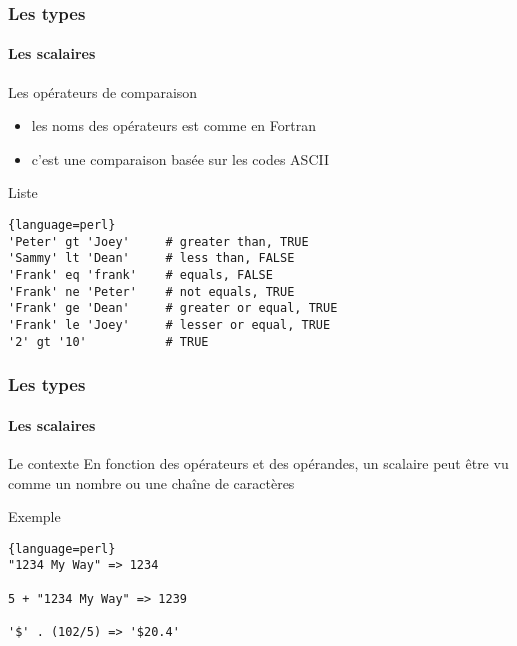 \begin{frame}[fragile]
  \frametitle{Les types}
  \framesubtitle{Les scalaires}

  \begin{block}{Les opérateurs de comparaison}
    \begin{itemize}
    \item les noms des opérateurs est comme en Fortran
    \item c'est une comparaison basée sur les codes ASCII
    \end{itemize}
  \end{block}

  \begin{exampleblock}{Liste}
    \begin{lstlisting}{language=perl}
'Peter' gt 'Joey'     # greater than, TRUE
'Sammy' lt 'Dean'     # less than, FALSE
'Frank' eq 'frank'    # equals, FALSE
'Frank' ne 'Peter'    # not equals, TRUE
'Frank' ge 'Dean'     # greater or equal, TRUE
'Frank' le 'Joey'     # lesser or equal, TRUE
'2' gt '10'           # TRUE
    \end{lstlisting}
  \end{exampleblock}

\end{frame}

\begin{frame}[fragile]
  \frametitle{Les types}
  \framesubtitle{Les scalaires}

  \begin{block}{Le contexte}
    En fonction des opérateurs et des opérandes, un scalaire peut
    être vu comme un nombre ou une chaîne de caractères
  \end{block}

  \begin{exampleblock}{Exemple}
    \begin{lstlisting}{language=perl}
"1234 My Way" => 1234

5 + "1234 My Way" => 1239

'$' . (102/5) => '$20.4'
    \end{lstlisting}
  \end{exampleblock}

\end{frame}

